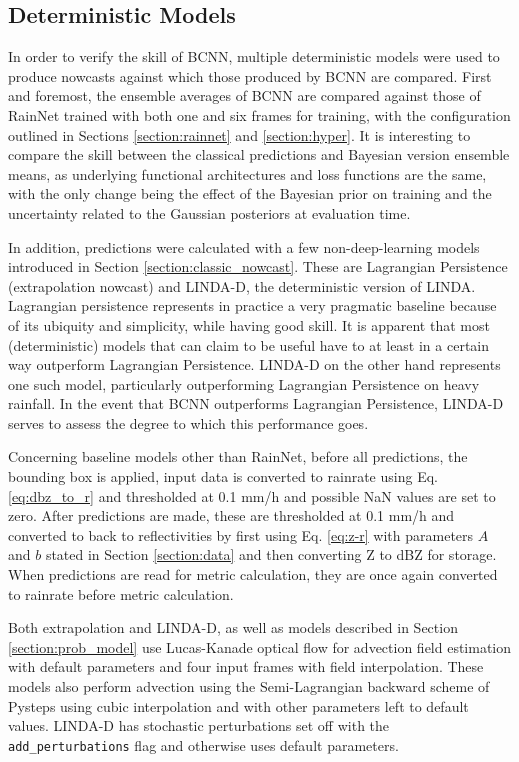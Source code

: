 \subsection{Deterministic Models}
\label{section:det_model}

In order to verify the skill of BCNN, multiple deterministic models were used to produce nowcasts against which those produced by BCNN are compared. First and foremost, the ensemble averages of BCNN are compared against those of RainNet trained with both one and six frames for training, with the configuration outlined in Sections \ref{section:rainnet} and \ref{section:hyper}. It is interesting to compare the skill between the classical predictions and Bayesian version ensemble means, as underlying functional architectures and loss functions are the same, with the only change being the effect of the Bayesian prior on training and the uncertainty related to the Gaussian posteriors at evaluation time. 

In addition, predictions were calculated with a few non-deep-learning models introduced in Section \ref{section:classic_nowcast}. These are Lagrangian Persistence (extrapolation nowcast) and LINDA-D, the deterministic version of LINDA. Lagrangian persistence represents in practice 
a very pragmatic baseline because of its ubiquity and simplicity, while having good skill. It is apparent that most (deterministic) models that can claim to be useful have to at least in a certain way outperform Lagrangian Persistence. LINDA-D on the other hand represents one such model, particularly outperforming Lagrangian Persistence on heavy rainfall. In the event that BCNN outperforms Lagrangian Persistence, LINDA-D serves to assess the degree to which this performance goes. 


Concerning baseline models other than RainNet, before all predictions, the bounding box is applied, input data is converted to rainrate using Eq. \eqref{eq:dbz_to_r} and thresholded at 0.1 mm/h and possible NaN values are set to zero. After predictions are made, these are thresholded at 0.1 mm/h and converted to back to reflectivities by first using Eq. \eqref{eq:z-r} with parameters $A$ and $b$ stated in Section \ref{section:data} and then converting Z to dBZ for storage. When predictions are read for metric calculation, they are once again converted to rainrate before metric calculation.

Both extrapolation and LINDA-D, as well as models described in Section \ref{section:prob_model} use Lucas-Kanade optical flow for advection field estimation with default parameters and four input frames with field interpolation. These models also perform advection using the Semi-Lagrangian backward scheme of Pysteps using cubic interpolation and with other parameters left to default values. LINDA-D has stochastic perturbations set off with the \texttt{add\_perturbations} flag and otherwise uses default parameters. 



